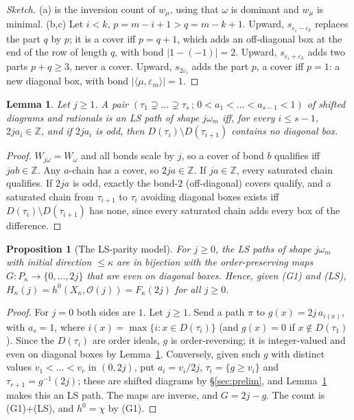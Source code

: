 \documentclass[submission]{FPSAC2027}
\newtheorem{proposition}[theorem]{Proposition}
\newtheorem{lemma}[theorem]{Lemma}
\theoremstyle{definition}
\theoremstyle{remark}
\newcommand{\cO}{\mathcal{O}}
\newcommand{\Z}{\mathbb{Z}}
\begin{document}
\begin{proof}[Sketch]
(a) is the inversion count of $w_\mu$, using that $\omega$ is dominant and $w_\mu$ is minimal.
(b,c) Let $i<k$, $p=m-i+1>q=m-k+1$. Upward, $s_{\varepsilon_i-\varepsilon_k}$ replaces the part
$q$ by $p$; it is a cover iff $p=q+1$, which adds an off-diagonal box at the end of the row of
length $q$, with bond $|1-(-1)|=2$. Upward, $s_{\varepsilon_i+\varepsilon_k}$ adds two parts
$p+q\ge3$, never a cover. Upward, $s_{2\varepsilon_i}$ adds the part $p$, a cover iff $p=1$: a new
diagonal box, with bond $|\langle\mu,\varepsilon_m\rangle|=1$.
\end{proof}

\begin{lemma}\label{lem:lsparity}
Let $j\ge1$. A pair $(\tau_1\supsetneq\dots\supsetneq\tau_s\,;\,0<a_1<\dots<a_{s-1}<1)$ of
shifted diagrams and rationals is an LS path of shape $j\omega_m$ iff, for every
$i\le s-1$, $2ja_i\in\Z$, and if $2ja_i$ is odd, then $D(\tau_i)\setminus D(\tau_{i+1})$
contains no diagonal box.
\end{lemma}

\begin{proof}
$W_{j\omega}=W_\omega$ and all bonds scale by $j$, so a cover of bond $b$ qualifies iff $jab\in\Z$.
Any $a$-chain has a cover, so $2ja\in\Z$. If $ja\in\Z$, every saturated chain qualifies. If $2ja$
is odd, exactly the bond-$2$ (off-diagonal) covers qualify, and a saturated chain from
$\tau_{i+1}$ to $\tau_i$ avoiding diagonal boxes exists iff $D(\tau_i)\setminus D(\tau_{i+1})$ has
none, since every saturated chain adds every box of the difference.
\end{proof}

\begin{proposition}[The LS-parity model]\label{prop:model}
For $j\ge0$, the LS paths of shape $j\omega_m$ with initial direction $\le\kappa$ are in bijection
with the order-preserving maps $G\colon P_\kappa\to\{0,\dots,2j\}$ that are even on diagonal boxes.
Hence, given (G1) and (LS), $H_\kappa(j)=h^0(X_\kappa,\cO(j))=F_\kappa(2j)$ for all $j\ge0$.
\end{proposition}

\begin{proof}
For $j=0$ both sides are $1$. Let $j\ge1$. Send a path $\pi$ to $g(x)=2j\,a_{i(x)}$, with $a_s=1$, where
$i(x)=\max\{i:x\in D(\tau_i)\}$ (and $g(x)=0$ if $x\notin D(\tau_1)$). Since the $D(\tau_i)$ are
order ideals, $g$ is order-reversing; it is integer-valued and even on diagonal boxes by
Lemma~\ref{lem:lsparity}. Conversely, given such $g$ with distinct values $v_1<\dots<v_r$ in
$(0,2j)$, put $a_i=v_i/2j$, $\tau_i=\{g\ge v_i\}$ and $\tau_{r+1}=g^{-1}(2j)$; these are shifted
diagrams by \S\ref{sec:prelim}, and Lemma~\ref{lem:lsparity} makes this an LS path. The maps are
inverse, and $G=2j-g$. The count is (G1)+(LS), and $h^0=\chi$ by (G1).
\end{proof}
\end{document}
